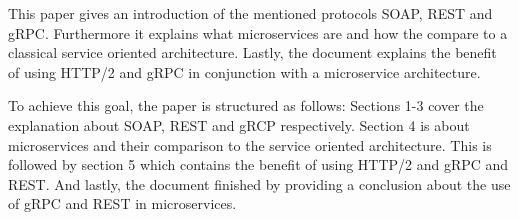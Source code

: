 \documentclass[conference]{IEEEtran}
\begin{document}
This paper gives an introduction of the mentioned protocols SOAP, REST and gRPC. Furthermore it explains what microservices are and how the compare to a classical service oriented architecture. Lastly, the document explains the benefit of using HTTP/2 and gRPC in conjunction with a microservice architecture.

To achieve this goal, the paper is structured as follows: Sections 1-3 cover the explanation about SOAP, REST and gRCP respectively. Section 4 is about microservices and their comparison to the service oriented architecture. This is followed by section 5 which contains the benefit of using HTTP/2 and gRPC and REST. And lastly, the document finished by providing a conclusion about the use of gRPC and REST in microservices.


\end{document}
